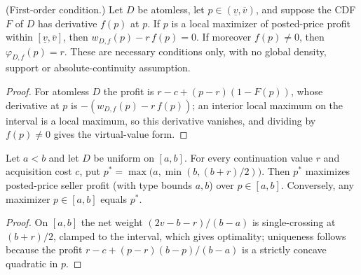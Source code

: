 \begin{theorem}\label{thm:MathEconLib.ValueDistribution.netVirtualSurplus_eq_zero_of_isLocalMaxOn_sellerProfit_postedPriceProblem}\leanok
{}
(First-order condition.) Let $D$ be atomless, let $p\in(\underline v,\overline v)$, and suppose the CDF $F$ of $D$ has derivative $f(p)$ at $p$. If $p$ is a local maximizer of posted-price profit within $[\underline v,\overline v]$, then $w_{D,f}(p)-r\,f(p)=0$. If moreover $f(p)\neq0$, then $\varphi_{D,f}(p)=r$. These are necessary conditions only, with no global density, support or absolute-continuity assumption.
\end{theorem}
\begin{proof}\leanok
{}
For atomless $D$ the profit is $r-c+(p-r)(1-F(p))$, whose derivative at $p$ is $-(w_{D,f}(p)-r\,f(p))$; an interior local maximum on the interval is a local maximum, so this derivative vanishes, and dividing by $f(p)\neq0$ gives the virtual-value form.
\end{proof}

\begin{theorem}\label{thm:MathEconLib.ValueDistribution.isMaxOn_sellerProfit_uniformInterval}\leanok
{}
Let $a<b$ and let $D$ be uniform on $[a,b]$. For every continuation value $r$ and acquisition cost $c$, put $p^*=\max\bigl(a,\min(b,(b+r)/2)\bigr)$. Then $p^*$ maximizes posted-price seller profit (with type bounds $a,b$) over $p\in[a,b]$. Conversely, any maximizer $p\in[a,b]$ equals $p^*$.
\end{theorem}
\begin{proof}\leanok
{}
On $[a,b]$ the net weight $(2v-b-r)/(b-a)$ is single-crossing at $(b+r)/2$, clamped to the interval, which gives optimality; uniqueness follows because the profit $r-c+(p-r)(b-p)/(b-a)$ is a strictly concave quadratic in $p$.
\end{proof}

